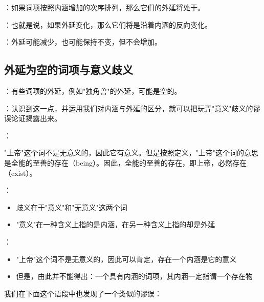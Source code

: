 \begin{theorembox}[title=修正的反变规律]
：如果词项按照内涵增加的次序排列，那么它们的外延将处于。

：也就是说，如果外延变化，那么它们将是沿着内涵的反向变化。

：外延可能减少，也可能保持不变，但不会增加。
\end{theorembox}

\subsection{外延为空的词项与意义歧义}

\begin{theorembox}[title=空外延词项的存在]
：有些词项的外延，例如"独角兽"的外延，可能是空的。

：认识到这一点，并运用我们对内涵与外延的区分，就可以把玩弄"意义"歧义的谬误论证揭露出来。
\end{theorembox}

\begin{examplebox}[title=上帝存在论证的谬误分析]
：
\begin{displayquote}
"上帝"这个词不是无意义的，因此它有意义。但是按照定义，"上帝"这个词的意思是全能的至善的存在（being）。因此，全能的至善的存在，即上帝，必然存在（exist）。
\end{displayquote}

：
\begin{itemize}
  \item 歧义在于"意义"和"无意义"这两个词
  \item "意义"在一种含义上指的是内涵，在另一种含义上指的却是外延
\end{itemize}

：
\begin{itemize}
  \item "上帝"这个词不是无意义的，因此可以肯定，存在一个内涵是它的意义
  \item 但是，由此并不能得出：一个具有内涵的词项，其内涵一定指谓一个存在物\cite{gombocz1997}
\end{itemize}
\end{examplebox}

我们在下面这个语段中也发现了一个类似的谬误：

